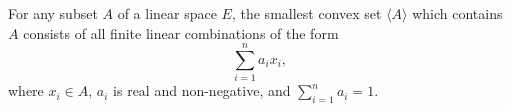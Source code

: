 For any subset $A$ of a linear space $E$, the smallest convex set $\langle A \rangle$ which contains $A$ consists of all finite linear combinations of the form
$$
\sum_{i=1}^{n} a_i x_i,
$$
where $x_i \in A$, $a_i$ is real and non-negative, and $\sum_{i=1}^{n} a_i = 1$.
